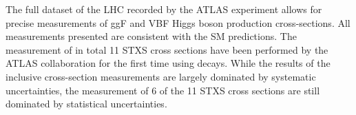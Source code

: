 


The full \RunTwo dataset of the LHC recorded by the ATLAS experiment allows for precise measurements of ggF and VBF Higgs boson production cross-sections.
All measurements presented are consistent with the SM predictions. 
The measurement of in total 11 STXS cross sections have been performed by the ATLAS collaboration for the first time using \HWW decays. 
While the results of the inclusive cross-section measurements are largely dominated by systematic uncertainties, the measurement of 6 of the 11 STXS cross sections are still dominated by statistical uncertainties. 

